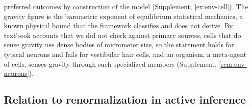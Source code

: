 preferred outcomes by construction of the model (Supplement, \cref{ex:env-cell}). The gravity figure is the barometric exponent of equilibrium statistical mechanics, a known physical bound that the framework classifies and does not derive. By textbook accounts that we did not check against primary sources, cells that do sense gravity use dense bodies of micrometer size, so the statement holds for typical neurons and fails for vestibular hair cells, and an organism, a meta-agent of cells, senses gravity through such specialized members (Supplement, \cref{rem:env-neurons}).

\subsection{Relation to renormalization in active inference}\label{sec:dis-renormalization}

